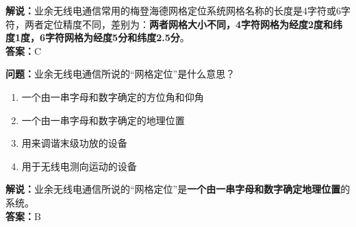 \textbf{解说：}业余无线电通信常用的梅登海德网格定位系统网格名称的长度是4字符或6字符，两者定位精度不同，差别为：\textbf{两者网格大小不同，4字符网格为经度2度和纬度1度，6字符网格为经度5分和纬度2.5分}。\\\textbf{答案：}C


\textbf{问题：}业余无线电通信所说的“网格定位”是什么意思？

\begin{enumerate}[label=\Alph*), leftmargin=1.5cm]
	\item 一个由一串字母和数字确定的方位角和仰角
	\item 一个由一串字母和数字确定的地理位置
	\item 用来调谐末级功放的设备
	\item 用于无线电测向运动的设备
\end{enumerate}

\textbf{解说：}业余无线电通信所说的“网格定位”是\textbf{一个由一串字母和数字确定地理位置}的系统。\\\textbf{答案：}B
